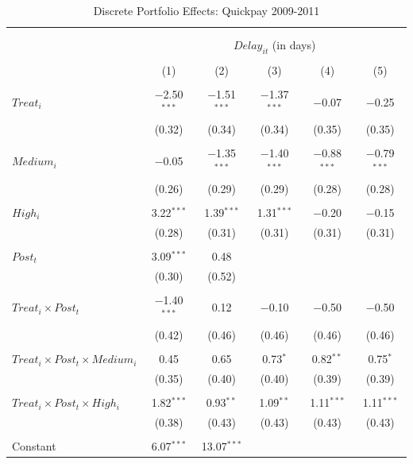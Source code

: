 \documentclass[
]{article}
\begin{document}
\begin{table}[H] \centering 
  \caption{Discrete Portfolio Effects: Quickpay 2009-2011} 
  \label{} 
\small 
\begin{tabular}{@{\extracolsep{-2pt}}lccccc} 
\\[-1.8ex]\hline 
\hline \\[-1.8ex] 
\\[-1.8ex] & \multicolumn{5}{c}{$Delay_{it}$ (in days)} \\ 
\\[-1.8ex] & (1) & (2) & (3) & (4) & (5)\\ 
\hline \\[-1.8ex] 
 $Treat_i$ & $-$2.50$^{***}$ & $-$1.51$^{***}$ & $-$1.37$^{***}$ & $-$0.07 & $-$0.25 \\ 
  & (0.32) & (0.34) & (0.34) & (0.35) & (0.35) \\ 
  & & & & & \\ 
 $Medium_i$ & $-$0.05 & $-$1.35$^{***}$ & $-$1.40$^{***}$ & $-$0.88$^{***}$ & $-$0.79$^{***}$ \\ 
  & (0.26) & (0.29) & (0.29) & (0.28) & (0.28) \\ 
  & & & & & \\ 
 $High_i$ & 3.22$^{***}$ & 1.39$^{***}$ & 1.31$^{***}$ & $-$0.20 & $-$0.15 \\ 
  & (0.28) & (0.31) & (0.31) & (0.31) & (0.31) \\ 
  & & & & & \\ 
 $Post_t$ & 3.09$^{***}$ & 0.48 &  &  &  \\ 
  & (0.30) & (0.52) &  &  &  \\ 
  & & & & & \\ 
 $Treat_i \times Post_t$ & $-$1.40$^{***}$ & 0.12 & $-$0.10 & $-$0.50 & $-$0.50 \\ 
  & (0.42) & (0.46) & (0.46) & (0.46) & (0.46) \\ 
  & & & & & \\ 
 $Treat_i \times Post_t \times Medium_i$ & 0.45 & 0.65 & 0.73$^{*}$ & 0.82$^{**}$ & 0.75$^{*}$ \\ 
  & (0.35) & (0.40) & (0.40) & (0.39) & (0.39) \\ 
  & & & & & \\ 
 $Treat_i \times Post_t \times High_i$ & 1.82$^{***}$ & 0.93$^{**}$ & 1.09$^{**}$ & 1.11$^{***}$ & 1.11$^{***}$ \\ 
  & (0.38) & (0.43) & (0.43) & (0.43) & (0.43) \\ 
  & & & & & \\ 
 Constant & 6.07$^{***}$ & 13.07$^{***}$ &  &  &  \\ 

\end{tabular}
\end{table}
\end{document}
